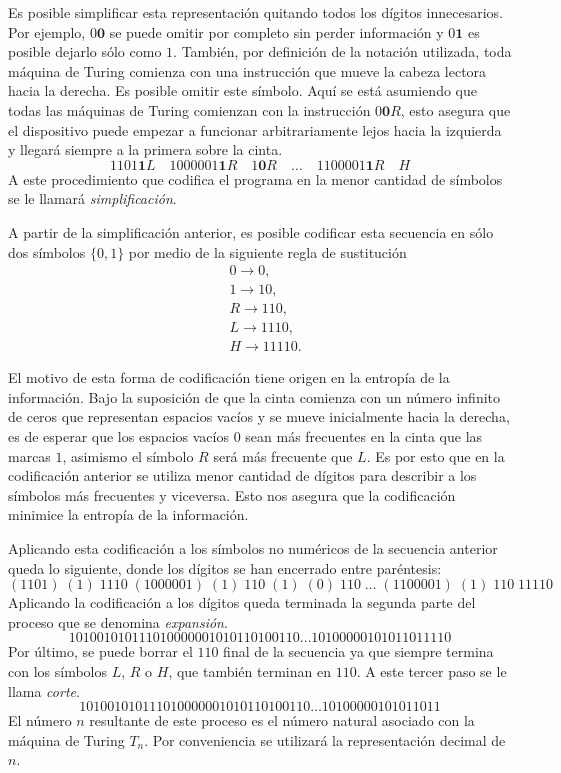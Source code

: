 \documentclass[10pt,a4paper]{article}
\begin{document}
Es posible simplificar esta representación quitando todos los dígitos innecesarios. Por ejemplo, $0 \textbf{0}$ se puede omitir por completo sin perder información y $0 \textbf{1}$ es posible dejarlo sólo como $1$. También, por definición de la notación utilizada, toda máquina de Turing comienza con una instrucción que mueve la cabeza lectora hacia la derecha. Es posible omitir este símbolo. Aquí se está asumiendo que todas las máquinas de Turing comienzan con la instrucción $0 \textbf{0} R$, esto asegura que el dispositivo puede empezar a funcionar arbitrariamente lejos hacia la izquierda y llegará siempre a la primera sobre la cinta.
\[
	1101 \textbf{1} L \quad 1000001 \textbf{1} R \quad 1 \textbf{0} R \quad \dots \quad 1100001 \textbf{1} R \quad H
\]
A este procedimiento que codifica el programa en la menor cantidad de símbolos se le llamará \textit{simplificación}.

A partir de la simplificación anterior, es posible codificar esta secuencia en sólo dos símbolos $\{0,1\}$ por medio de la siguiente regla de sustitución
\begin{align*}
	&0 \rightarrow 0,\\
	&1 \rightarrow 10,\\
	&R \rightarrow 110,\\
	&L \rightarrow 1110,\\
	&H \rightarrow 11110.
\end{align*}

El motivo de esta forma de codificación tiene origen en la entropía de la información. Bajo la suposición de que la cinta comienza con un número infinito de ceros que representan espacios vacíos y se mueve inicialmente hacia la derecha, es de esperar que los espacios vacíos $0$ sean más frecuentes en la cinta que las marcas $1$, asimismo el símbolo $R$ será más frecuente que $L$. Es por esto que en la codificación anterior se utiliza menor cantidad de dígitos para describir a los símbolos más frecuentes y viceversa. Esto nos asegura que la codificación minimice la entropía de la información.

Aplicando esta codificación a los símbolos no numéricos de la secuencia anterior queda lo siguiente, donde los dígitos se han encerrado entre paréntesis:
\[
	(1101) \; (1) \; 1110 \; (1000001) \; (1) \; 110 \; (1) \; (0) \; 110 \; \dots \; (1100001) \; (1) \; 110 \; 11110
\]
Aplicando la codificación a los dígitos queda terminada la segunda parte del proceso que se denomina \textit{expansión}.
\[
	101001010111010000001010110100110 \dots 10100000101011011110
\]
Por último, se puede borrar el $110$ final de la secuencia ya que siempre termina con los símbolos $L$, $R$ o $H$, que también terminan en $110$. A este tercer paso se le llama \textit{corte}.
\[
	101001010111010000001010110100110 \dots 10100000101011011
\]
El número $n$ resultante de este proceso es el número natural asociado con la máquina de Turing $T_n$. Por conveniencia se utilizará la representación decimal de $n$.
\end{document}
